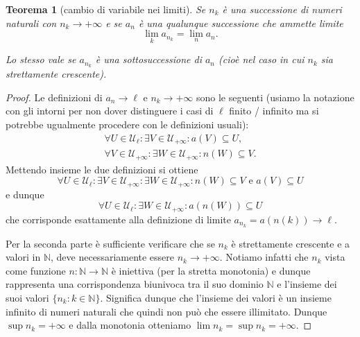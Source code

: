 \documentclass[italian,a4paper,oneside,headinclude]{scrbook}
\renewcommand{\subset}{\subseteq}
\newcommand{\U}{\mathcal U}
\newcommand{\NN}{\mathbb N}
\newtheorem{theorem}{Teorema}
\begin{document}
\begin{theorem}[cambio di variabile nei limiti]
Se $n_k$ è una successione di numeri naturali con $n_k\to +\infty$
e se $a_n$ è una qualunque successione che ammette limite
\[
  \lim_k a_{n_k} = \lim_n a_n.
\]

Lo stesso vale se $a_{n_k}$ è una sottosuccessione
di $a_n$ (cioè nel caso in cui $n_k$ sia strettamente crescente).
\end{theorem}
%
\begin{proof}
Le definizioni di $a_n \to \ell$ e $n_k \to +\infty$ sono le seguenti
(usiamo la notazione con gli intorni per non dover distinguere
i casi di $\ell$ finito / infinito ma si potrebbe ugualmente
procedere con le definizioni usuali):
\begin{gather*}
 \forall U \in \U_\ell \colon \exists V \in \U_{+\infty} \colon
  a(V) \subset U,\\
 \forall V \in \U_{+\infty} \colon \exists W \in \U_{+\infty} \colon
  n(W) \subset V.
\end{gather*}
Mettendo insieme le due definizioni si ottiene
\[
  \forall U \in \U_\ell \colon
  \exists V \in \U_{+\infty} \colon
  \exists W \in \U_{+\infty} \colon
  n(W) \subset V \text{ e }
  a(V) \subset U
\]
e dunque
\[
  \forall U \in \U_\ell \colon \exists W \in \U_{+\infty} \colon
  a(n(W)) \subset U
\]
che corrisponde esattamente alla definizione di limite $a_{n_k} = a(n(k)) \to \ell$.

Per la seconda parte è sufficiente verificare che se $n_k$
è strettamente crescente
e a valori in $\NN$, deve necessariamente essere $n_k\to +\infty$.
Notiamo infatti che $n_k$ vista come funzione $n\colon \NN\to \NN$
è iniettiva (per la stretta monotonia) e dunque rappresenta una
corrispondenza biunivoca tra il suo dominio $\NN$ e l'insieme dei
suoi valori $\{n_k \colon k \in \NN\}$. Significa dunque che l'insieme
dei valori è un insieme infinito di numeri naturali che quindi non può che
essere illimitato. Dunque $\sup n_k = +\infty$ e dalla monotonia
otteniamo $\lim n_k = \sup n_k = +\infty$.
\end{proof}
\end{document}
